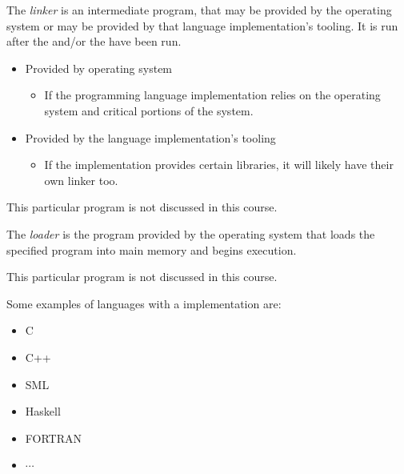 \begin{definition}[Linker]\label{def:Linker}
  The \emph{linker} is an intermediate program, that may be provided by the operating system or may be provided by that language implementation's tooling.
  It is run after the  and/or the  have been run.
  \begin{itemize}[noitemsep]
  \item Provided by operating system
    \begin{itemize}[noitemsep]
    \item If the programming language implementation relies on the operating system and critical portions of the system.
    \end{itemize}
  \item Provided by the language implementation's tooling
    \begin{itemize}[noitemsep]
    \item If the implementation provides certain libraries, it will likely have their own linker too.
    \end{itemize}
  \end{itemize}

  \begin{remark}
    This particular program is not discussed in this course.
  \end{remark}
\end{definition}

\begin{definition}[Loader]\label{def:Loader}
  The \emph{loader} is the program provided by the operating system that loads the specified program into main memory and begins execution.
  
  \begin{remark}
    This particular program is not discussed in this course.
  \end{remark}
\end{definition}

Some examples of languages with a  implementation are:
\begin{itemize}[noitemsep]
\item C
\item C++
\item SML
\item Haskell
\item FORTRAN
\item $\cdots$
\end{itemize}

